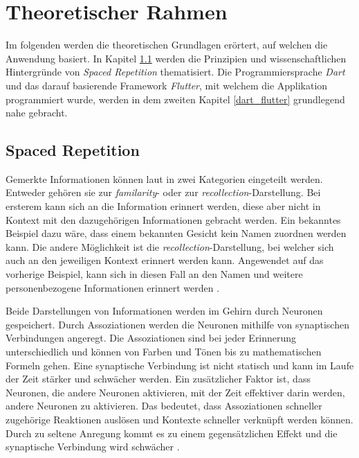 \chapter{Theoretischer Rahmen}
Im folgenden werden die theoretischen Grundlagen erörtert, auf welchen die Anwendung basiert. In Kapitel \ref{spaced_rep} werden die Prinzipien und wissenschaftlichen Hintergründe von \textit{Spaced Repetition} thematisiert. Die Programmiersprache \textit{Dart} und das darauf basierende Framework \textit{Flutter}, mit welchem die Applikation programmiert wurde, werden in dem zweiten Kapitel \ref{dart_flutter} grundlegend nahe gebracht.

\section{Spaced Repetition}
\label{spaced_rep}
Gemerkte Informationen können laut \cite{SA:Forget} in zwei Kategorien eingeteilt werden. Entweder gehören sie zur \textit{familarity}- oder zur \textit{recollection}-Darstellung. Bei ersterem kann sich an die Information erinnert werden, diese aber nicht in Kontext mit den dazugehörigen Informationen gebracht werden. Ein bekanntes Beispiel dazu wäre, dass einem bekannten Gesicht kein Namen zuordnen werden kann. Die andere Möglichkeit ist die \textit{recollection}-Darstellung, bei welcher sich auch an den jeweiligen Kontext erinnert werden kann. Angewendet auf das vorherige Beispiel, kann sich in diesen Fall an den Namen und weitere personenbezogene Informationen erinnert werden \cite{SA:Forget}.

Beide Darstellungen von Informationen werden im Gehirn durch Neuronen gespeichert. Durch Assoziationen werden die Neuronen mithilfe von synaptischen Verbindungen angeregt. Die Assoziationen sind bei jeder Erinnerung unterschiedlich und können von Farben und Tönen bis zu mathematischen Formeln gehen. Eine synaptische Verbindung ist nicht statisch und kann im Laufe der Zeit stärker und schwächer werden. Ein zusätzlicher Faktor ist, dass Neuronen, die andere Neuronen aktivieren, mit der Zeit effektiver darin werden, andere Neuronen zu aktivieren. Das bedeutet, dass Assoziationen schneller zugehörige Reaktionen auslösen und Kontexte schneller verknüpft werden können. Durch zu seltene Anregung kommt es zu einem gegensätzlichen Effekt und die synaptische Verbindung wird schwächer \cite{SDW:Vergessen}.

